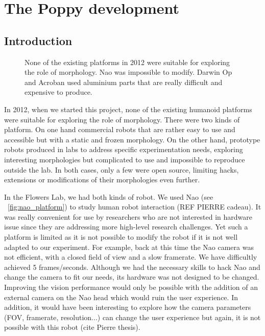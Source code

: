
% 
\chapter{The Poppy development} %


\section{Introduction} %

\begin{figure}[tb]
\centering
    \hfil
    \hfil
    \caption{None of the existing platforms in 2012 were suitable for exploring the role of morphology. Nao was impossible to modify. Darwin Op and Acroban used aluminium parts that are really difficult and expensive to produce.}
    \label{fig:2012_Humanoids}
\end{figure}

In 2012, when we started this project, none of the existing humanoid platforms were suitable for exploring the role of morphology. There were two kinds of platform. On one hand commercial robots that are rather easy to use and accessible but with a static and frozen morphology. On the other hand, prototype robots produced in labs to address specific experimentation needs, exploring interesting morphologies but complicated to use and impossible to reproduce outside the lab. In both cases, only a few were open source, limiting hacks, extensions or modifications of their morphologies even further.


In the Flowers Lab, we had both kinds of robot. We used Nao (see \figurename~\ref{fig:nao_platform}) to study human robot interaction (REF PIERRE cadeau). It was really convenient for use by researchers who are not interested in hardware issue since they are addressing more high-level research challenges. Yet such a platform is limited as it is not possible to modify the robot if it is not well adapted to our experiment. For example, back at this time the Nao camera was not efficient, with a closed field of view and a slow framerate. We have difficultly achieved 5 frames/seconds. Although we had the necessary skills to hack Nao and change the camera to fit our needs, its hardware was not designed to be changed. Improving the vision performance would only be possible with the addition of an external camera on the Nao head which would ruin the user experience. In addition, it would have been interesting to explore how the camera parameters (FOV, framerate, resolution...) can change the user experience but again, it is not possible with this robot (cite Pierre thesis).


